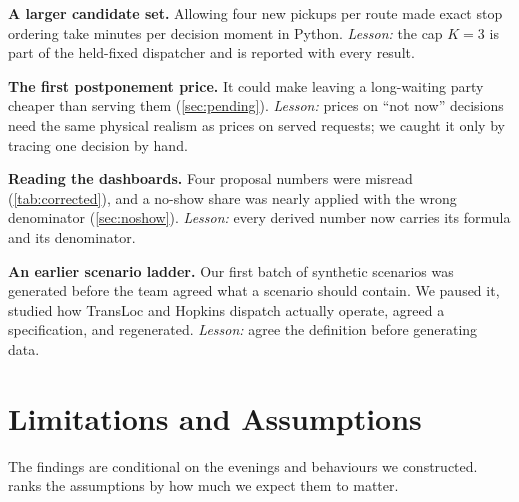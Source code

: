 \documentclass{article}
\begin{document}
\textbf{A larger candidate set.} Allowing four new pickups per route made exact stop ordering take minutes per decision moment in Python. \emph{Lesson:} the cap $K=3$ is part of the held-fixed dispatcher and is reported with every result.

\textbf{The first postponement price.} It could make leaving a long-waiting party cheaper than serving them (\cref{sec:pending}). \emph{Lesson:} prices on ``not now'' decisions need the same physical realism as prices on served requests; we caught it only by tracing one decision by hand.

\textbf{Reading the dashboards.} Four proposal numbers were misread (\cref{tab:corrected}), and a no-show share was nearly applied with the wrong denominator (\cref{sec:noshow}). \emph{Lesson:} every derived number now carries its formula and its denominator.

\textbf{An earlier scenario ladder.} Our first batch of synthetic scenarios was generated before the team agreed what a scenario should contain. We paused it, studied how TransLoc and Hopkins dispatch actually operate, agreed a specification, and regenerated. \emph{Lesson:} agree the definition before generating data.

\section{Limitations and Assumptions}\label{sec:limits}

The findings are conditional on the evenings and behaviours we constructed.  ranks the assumptions by how much we expect them to matter.
\end{document}
